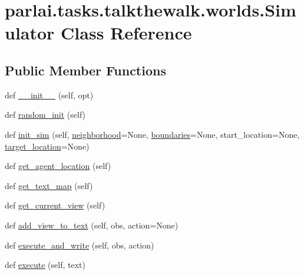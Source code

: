 \hypertarget{classparlai_1_1tasks_1_1talkthewalk_1_1worlds_1_1Simulator}{}\section{parlai.\+tasks.\+talkthewalk.\+worlds.\+Simulator Class Reference}
\label{classparlai_1_1tasks_1_1talkthewalk_1_1worlds_1_1Simulator}
\subsection*{Public Member Functions}
\begin{DoxyCompactItemize}
\item 
def \hyperlink{classparlai_1_1tasks_1_1talkthewalk_1_1worlds_1_1Simulator_af0dd9259b1847530dd06e97c004b4992}{\+\_\+\+\_\+init\+\_\+\+\_\+} (self, opt)
\item 
def \hyperlink{classparlai_1_1tasks_1_1talkthewalk_1_1worlds_1_1Simulator_adde735badb8bd967efbc8e6a71378bac}{random\+\_\+init} (self)
\item 
def \hyperlink{classparlai_1_1tasks_1_1talkthewalk_1_1worlds_1_1Simulator_a0bd93cb7b6958af1795e6c0adf47cb4d}{init\+\_\+sim} (self, \hyperlink{classparlai_1_1tasks_1_1talkthewalk_1_1worlds_1_1Simulator_a79e2dd5fa3d217ff8e909ef731e38314}{neighborhood}=None, \hyperlink{classparlai_1_1tasks_1_1talkthewalk_1_1worlds_1_1Simulator_afb9280ec4243b403e5b8d7cf694dddd2}{boundaries}=None, start\+\_\+location=None, \hyperlink{classparlai_1_1tasks_1_1talkthewalk_1_1worlds_1_1Simulator_a3d22320d10a2fea9c185be6a0e7bc1fb}{target\+\_\+location}=None)
\item 
def \hyperlink{classparlai_1_1tasks_1_1talkthewalk_1_1worlds_1_1Simulator_ae3cf085288804e12b1d8e70e22f1017e}{get\+\_\+agent\+\_\+location} (self)
\item 
def \hyperlink{classparlai_1_1tasks_1_1talkthewalk_1_1worlds_1_1Simulator_ac582ca2c2642272362fdaf7acd5b4b81}{get\+\_\+text\+\_\+map} (self)
\item 
def \hyperlink{classparlai_1_1tasks_1_1talkthewalk_1_1worlds_1_1Simulator_a5178f95389423f1ee1ad5440e60ad976}{get\+\_\+current\+\_\+view} (self)
\item 
def \hyperlink{classparlai_1_1tasks_1_1talkthewalk_1_1worlds_1_1Simulator_a7f1a6089e2650f3787e5493931a45570}{add\+\_\+view\+\_\+to\+\_\+text} (self, obs, action=None)
\item 
def \hyperlink{classparlai_1_1tasks_1_1talkthewalk_1_1worlds_1_1Simulator_ae196cf0b53564026703d3ebbd4e741eb}{execute\+\_\+and\+\_\+write} (self, obs, action)
\item 
def \hyperlink{classparlai_1_1tasks_1_1talkthewalk_1_1worlds_1_1Simulator_a4e8af8db9b10c3e5c34fdb9004d13694}{execute} (self, text)
\end{DoxyCompactItemize}
